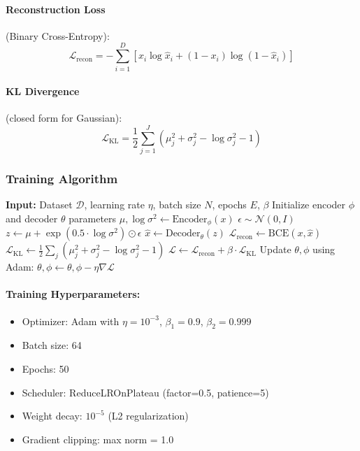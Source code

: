 \documentclass[conference]{IEEEtran}
\begin{document}
\paragraph{Reconstruction Loss} (Binary Cross-Entropy):
\begin{equation}
\mathcal{L}_{\text{recon}} = -\sum_{i=1}^{D} \left[ x_i \log \hat{x}_i + (1 - x_i) \log (1 - \hat{x}_i) \right]
\end{equation}

\paragraph{KL Divergence} (closed form for Gaussian):
\begin{equation}
\mathcal{L}_{\text{KL}} = \frac{1}{2} \sum_{j=1}^{J} \left( \mu_j^2 + \sigma_j^2 - \log \sigma_j^2 - 1 \right)
\end{equation}

\subsubsection{Training Algorithm}

\begin{algorithm}[H]
\caption{VAE Training}
\begin{algorithmic}[1]
\State \textbf{Input:} Dataset $\mathcal{D}$, learning rate $\eta$, batch size $N$, epochs $E$, $\beta$
\State Initialize encoder $\phi$ and decoder $\theta$ parameters
        \State $\mu, \log\sigma^2 \leftarrow \text{Encoder}_\phi(x)$
        \State $\epsilon \sim \mathcal{N}(0, I)$
        \State $z \leftarrow \mu + \exp(0.5 \cdot \log\sigma^2) \odot \epsilon$
        \State $\hat{x} \leftarrow \text{Decoder}_\theta(z)$
        \State $\mathcal{L}_{\text{recon}} \leftarrow \text{BCE}(x, \hat{x})$
        \State $\mathcal{L}_{\text{KL}} \leftarrow \frac{1}{2} \sum_j (\mu_j^2 + \sigma_j^2 - \log\sigma_j^2 - 1)$
        \State $\mathcal{L} \leftarrow \mathcal{L}_{\text{recon}} + \beta \cdot \mathcal{L}_{\text{KL}}$
        \State Update $\theta, \phi$ using Adam: $\theta, \phi \leftarrow \theta, \phi - \eta \nabla \mathcal{L}$
    \EndFor
\EndFor
\end{algorithmic}
\end{algorithm}

\paragraph{Training Hyperparameters:}
\begin{itemize}
    \item Optimizer: Adam with $\eta = 10^{-3}$, $\beta_1 = 0.9$, $\beta_2 = 0.999$
    \item Batch size: 64
    \item Epochs: 50
    \item Scheduler: ReduceLROnPlateau (factor=0.5, patience=5)
    \item Weight decay: $10^{-5}$ (L2 regularization)
    \item Gradient clipping: max norm = 1.0
\end{itemize}
\end{document}
